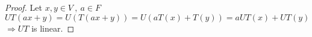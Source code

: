 \begin{proof}
	Let $x, y \in V \ ,\  a \in F$
\( U T(a x+y)=U(T(a x+y))= U (a T(x)+T(y))=a U T(x)+U T(y)\)
\(\Rightarrow U T\) is linear.
\end{proof}

